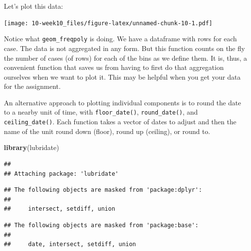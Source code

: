 \documentclass[]{book}
\newenvironment{Shaded}{\begin{snugshade}}{\end{snugshade}}
\newcommand{\CommentTok}[1]{\textcolor[rgb]{0.56,0.35,0.01}{\textit{#1}}}
\newcommand{\DataTypeTok}[1]{\textcolor[rgb]{0.13,0.29,0.53}{#1}}
\newcommand{\DecValTok}[1]{\textcolor[rgb]{0.00,0.00,0.81}{#1}}
\newcommand{\KeywordTok}[1]{\textcolor[rgb]{0.13,0.29,0.53}{\textbf{#1}}}
\newcommand{\NormalTok}[1]{#1}
\newcommand{\OperatorTok}[1]{\textcolor[rgb]{0.81,0.36,0.00}{\textbf{#1}}}
\newcommand{\StringTok}[1]{\textcolor[rgb]{0.31,0.60,0.02}{#1}}
\begin{document}
Let's plot this data:

\begin{Shaded}
\end{Shaded}

\texttt{[image: 10-week10\_files/figure-latex/unnamed-chunk-10-1.pdf]}

Notice what \texttt{geom\_freqpoly} is doing. We have a dataframe with rows for each case. The data is not aggregated in any form. But this function counts on the fly the number of cases (of rows) for each of the bins as we define them. It is, thus, a convenient function that saves us from having to first do that aggregation ourselves when we want to plot it. This may be helpful when you get your data for the assignment.

An alternative approach to plotting individual components is to round the date to a nearby unit of time, with \texttt{floor\_date()}, \texttt{round\_date()}, and \texttt{ceiling\_date()}. Each function takes a vector of dates to adjust and then the name of the unit round down (floor), round up (ceiling), or round to.

\begin{Shaded}
\begin{Highlighting}[]
\KeywordTok{library}\NormalTok{(lubridate)}
\end{Highlighting}
\end{Shaded}

\begin{verbatim}
## 
## Attaching package: 'lubridate'
\end{verbatim}

\begin{verbatim}
## The following objects are masked from 'package:dplyr':
## 
##     intersect, setdiff, union
\end{verbatim}

\begin{verbatim}
## The following objects are masked from 'package:base':
## 
##     date, intersect, setdiff, union
\end{verbatim}
\end{document}
